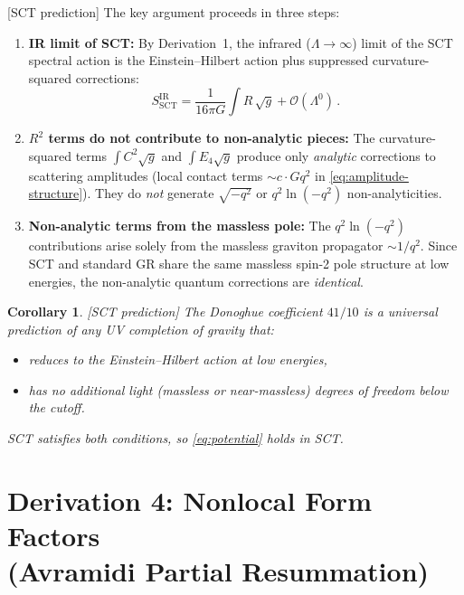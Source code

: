\documentclass[12pt,a4paper]{article}
\newtheorem{corollary}[proposition]{Corollary}
\theoremstyle{definition}
\theoremstyle{remark}
\newcommand{\sctpred}{\textcolor{purple!80!black}{\textsf{[SCT prediction]}}}
\begin{document}
\sctpred\;
The key argument proceeds in three steps:

\begin{enumerate}
\item \textbf{IR limit of SCT:}
  By Derivation~1, the infrared ($\Lambda\to\infty$) limit of the
  SCT spectral action is the Einstein--Hilbert action plus
  suppressed curvature-squared corrections:
  \begin{equation}
    S_{\mathrm{SCT}}^{\mathrm{IR}}
    = \frac{1}{16\pi G}\int R\,\sqrt{g}
    + \mathcal{O}(\Lambda^0)\,.
  \end{equation}

\item \textbf{$R^2$ terms do not contribute to non-analytic pieces:}
  The curvature-squared terms $\int C^2\sqrt{g}$ and $\int E_4\sqrt{g}$
  produce only \emph{analytic} corrections to scattering amplitudes
  (local contact terms $\sim c\cdot Gq^2$ in
  \eqref{eq:amplitude-structure}).  They do \emph{not} generate
  $\sqrt{-q^2}$ or $q^2\ln(-q^2)$ non-analyticities.

\item \textbf{Non-analytic terms from the massless pole:}
  The $q^2\ln(-q^2)$ contributions arise solely from the massless
  graviton propagator $\sim 1/q^2$.  Since SCT and standard GR share
  the same massless spin-2 pole structure at low energies, the
  non-analytic quantum corrections are \emph{identical}.
\end{enumerate}

\begin{corollary}
\sctpred\;
The Donoghue coefficient $41/10$ is a \emph{universal} prediction of
any UV completion of gravity that:
\begin{itemize}
\item reduces to the Einstein--Hilbert action at low energies,
\item has no additional light (massless or near-massless) degrees of
      freedom below the cutoff.
\end{itemize}
SCT satisfies both conditions, so \eqref{eq:potential} holds in SCT.
\end{corollary}


\newpage
\section{Derivation 4: Nonlocal Form Factors\\
         (Avramidi Partial Resummation)}
\label{sec:nonlocal}
\end{document}
